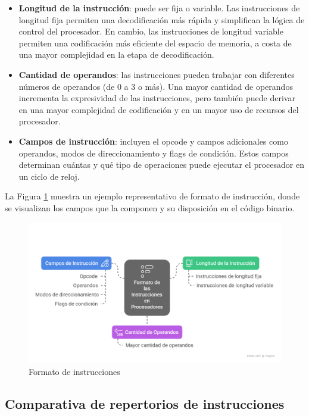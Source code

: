 \documentclass[12pt,oneside]{templates/unerthesis}
\providecommand{\tightlist}{%
  \setlength{\itemsep}{0pt}\setlength{\parskip}{0pt}}
\begin{document}
\begin{itemize}
\tightlist
\item
  \textbf{Longitud de la instrucción}: puede ser fija o variable. Las instrucciones de longitud fija permiten una decodificación más rápida y simplifican la lógica de control del procesador. En cambio, las instrucciones de longitud variable permiten una codificación más eficiente del espacio de memoria, a costa de una mayor complejidad en la etapa de decodificación.
\item
  \textbf{Cantidad de operandos}: las instrucciones pueden trabajar con diferentes números de operandos (de 0 a 3 o más). Una mayor cantidad de operandos incrementa la expresividad de las instrucciones, pero también puede derivar en una mayor complejidad de codificación y en un mayor uso de recursos del procesador.
\item
  \textbf{Campos de instrucción}: incluyen el opcode y campos adicionales como operandos, modos de direccionamiento y flags de condición. Estos campos determinan cuántas y qué tipo de operaciones puede ejecutar el procesador en un ciclo de reloj.
\end{itemize}

La Figura \ref{fig:forminst} muestra un ejemplo representativo de formato de instrucción, donde se visualizan los campos que la componen y su disposición en el código binario.

\begin{figure}

{\centering \includegraphics[width=1\linewidth]{images/formatoinst} 

}

\caption{Formato de instrucciones }\label{fig:forminst}
\end{figure}

\hypertarget{comparativa-de-repertorios-de-instrucciones}{%
\subsection{Comparativa de repertorios de instrucciones}\label{comparativa-de-repertorios-de-instrucciones}}
\end{document}
